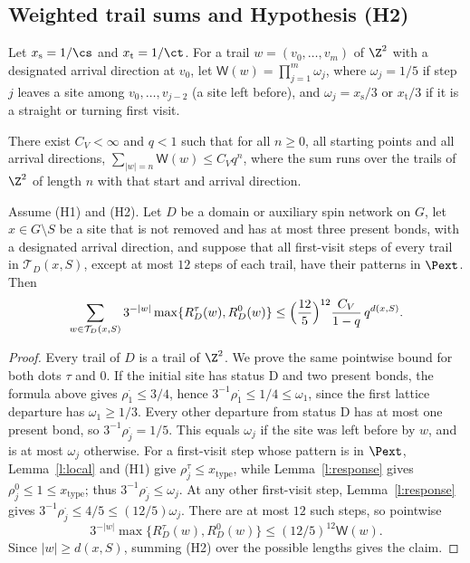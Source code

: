 \subsection{Weighted trail sums and Hypothesis (H2)}\label{s:H2def}

Let $x_{\mathrm s} = 1/\cs$ and $x_{\mathrm t} = 1/\ct$. For a trail $w = (v_0, \dots, v_m)$ of $\Z^2$ with a designated arrival direction at $v_0$, let $\mathsf W(w) = \prod_{j = 1}^m \omega_j$, where $\omega_j = 1/5$ if step $j$ leaves a site among $v_0, \dots, v_{j - 2}$ (a site left before), and $\omega_j = x_{\mathrm s}/3$ or $x_{\mathrm t}/3$ if it is a straight or turning first visit.

\begin{hypothesis}[H2]\label{h:H2}
There exist $C_V < \infty$ and $q < 1$ such that for all $n \ge 0$, all starting points and all arrival directions, $\sum_{|w| = n} \mathsf W(w) \le C_V q^n$, where the sum runs over the trails of $\Z^2$ of length $n$ with that start and arrival direction.
\end{hypothesis}

\begin{lemma}\label{l:onepoint}
Assume (H1) and (H2). Let $D$ be a domain or auxiliary spin network
on $G$, let $x\in G\setminus S$ be a site that is not removed and
has at most three present bonds, with a designated arrival direction,
and suppose that all first-visit steps of every trail in
$\mathcal T_D(x,S)$, except at most $12$ steps of each trail, have
their patterns in $\Pext$. Then
\begin{equation*}
\sum_{w\in\mathcal T_D(x,S)}3^{-|w|}
\max\{R^\tau_D(w),R^0_D(w)\}
\le \Bigl(\frac{12}{5}\Bigr)^{12}
\frac{C_V}{1-q}\,q^{d(x,S)}.
\end{equation*}
\end{lemma}

\begin{proof}
Every trail of $D$ is a trail of $\Z^2$. We prove the same pointwise
bound for both dots $\tau$ and $0$. If the initial site has status
$\mathrm D$ and two present bonds, the formula above gives
$\rho^\cdot_1\le3/4$, hence
$3^{-1}\rho^\cdot_1\le1/4\le\omega_1$, since the first lattice
departure has $\omega_1\ge1/3$. Every other departure from status
$\mathrm D$ has at most one present bond, so
$3^{-1}\rho^\cdot_j=1/5$. This equals $\omega_j$ if the site was
left before by $w$, and is at most $\omega_j$ otherwise. For a
first-visit step whose pattern is in $\Pext$,
Lemma~\ref{l:local} and (H1) give
$\rho^\tau_j\le x_{\mathrm{type}}$, while
Lemma~\ref{l:response} gives $\rho^0_j\le1\le x_{\mathrm{type}}$;
thus $3^{-1}\rho^\cdot_j\le\omega_j$. At any other first-visit
step, Lemma~\ref{l:response} gives
$3^{-1}\rho^\cdot_j\le4/5\le(12/5)\omega_j$.
There are at most $12$ such steps, so pointwise
\[
3^{-|w|}\max\{R^\tau_D(w),R^0_D(w)\}
\le (12/5)^{12}\mathsf W(w).
\]
Since $|w|\ge d(x,S)$, summing (H2) over the possible lengths gives
the claim.
\end{proof}
